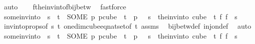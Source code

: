 \begin{isabellebody}
\ auto\isanewline
\ \ \isamarkupfalse%
\ f{\isacharunderscore}{\kern0pt}the{\isacharunderscore}{\kern0pt}inv{\isacharunderscore}{\kern0pt}into{\isacharunderscore}{\kern0pt}f{\isacharunderscore}{\kern0pt}bij{\isacharunderscore}{\kern0pt}betw\ \isamarkupfalse%
\ fastforce%
\endisatagproof
{\isafoldproof}%
%
\isadelimproof
\isanewline
%
\endisadelimproof
\isanewline
\isanewline
\isanewline
\isanewline
{}\isamarkupfalse%
\ some{\isacharunderscore}{\kern0pt}inv{\isacharunderscore}{\kern0pt}into{\isacharcolon}{\kern0pt}\ \ {\isachardoublequoteopen}s\ {\isacharless}{\kern0pt}\ t{\isachardoublequoteclose}\ \ {\isachardoublequoteopen}{\isacharparenleft}{\kern0pt}SOME\ p{\isachardot}{\kern0pt}\ p{\isasymin}cube\ {}\ t\ {\isasymand}\ p\ {}\ {\isacharequal}{\kern0pt}\ s{\isacharparenright}{\kern0pt}\ {\isacharequal}{\kern0pt}\ {\isacharparenleft}{\kern0pt}the{\isacharunderscore}{\kern0pt}inv{\isacharunderscore}{\kern0pt}into\ {\isacharparenleft}{\kern0pt}cube\ {}\ t{\isacharparenright}{\kern0pt}\ {\isacharparenleft}{\kern0pt}{\isasymlambda}f{\isachardot}{\kern0pt}\ f\ {}{\isacharparenright}{\kern0pt}\ s{\isacharparenright}{\kern0pt}{\isachardoublequoteclose}\isanewline
%
\isadelimproof
\ \ %
\endisadelimproof
%
\isatagproof
{}\isamarkupfalse%
\ invintoprops{\isacharbrackleft}{\kern0pt}of\ s\ t{\isacharbrackright}{\kern0pt}\ one{\isacharunderscore}{\kern0pt}dim{\isacharunderscore}{\kern0pt}cube{\isacharunderscore}{\kern0pt}eq{\isacharunderscore}{\kern0pt}nat{\isacharunderscore}{\kern0pt}set{\isacharbrackleft}{\kern0pt}of\ t{\isacharbrackright}{\kern0pt}\ assms\ \isamarkupfalse%
\ bij{\isacharunderscore}{\kern0pt}betw{\isacharunderscore}{\kern0pt}def\ inj{\isacharunderscore}{\kern0pt}on{\isacharunderscore}{\kern0pt}def\ \isamarkupfalse%
\ auto%
\endisatagproof
{\isafoldproof}%
%
\isadelimproof
\isanewline
%
\endisadelimproof
\isanewline
{}\isamarkupfalse%
\ some{\isacharunderscore}{\kern0pt}inv{\isacharunderscore}{\kern0pt}into{\isacharunderscore}{\kern0pt}{}{\isacharcolon}{\kern0pt}\ \ {\isachardoublequoteopen}s\ {\isacharless}{\kern0pt}\ t{\isachardoublequoteclose}\ \ {\isachardoublequoteopen}{\isacharparenleft}{\kern0pt}SOME\ p{\isachardot}{\kern0pt}\ p{\isasymin}cube\ {}\ {\isacharparenleft}{\kern0pt}t{\isacharplus}{\kern0pt}{}{\isacharparenright}{\kern0pt}\ {\isasymand}\ p\ {}\ {\isacharequal}{\kern0pt}\ s{\isacharparenright}{\kern0pt}\ {\isacharequal}{\kern0pt}\ {\isacharparenleft}{\kern0pt}the{\isacharunderscore}{\kern0pt}inv{\isacharunderscore}{\kern0pt}into\ {\isacharparenleft}{\kern0pt}cube\ {}\ t{\isacharparenright}{\kern0pt}\ {\isacharparenleft}{\kern0pt}{\isasymlambda}f{\isachardot}{\kern0pt}\ f\ {}{\isacharparenright}{\kern0pt}\ s{\isacharparenright}{\kern0pt}{\isachardoublequoteclose}\isanewline

\end{isabellebody}
